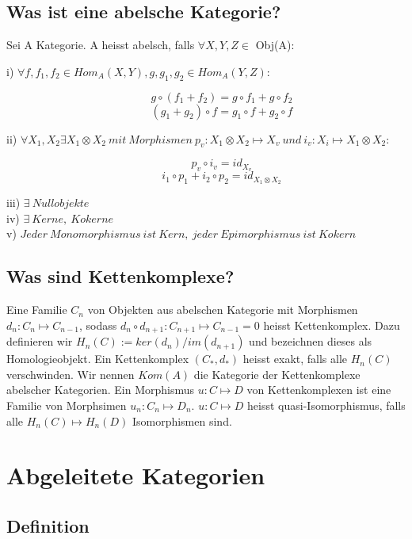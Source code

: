 \documentclass[12pt]{article}
\begin{document}
\subsection{Was ist eine abelsche Kategorie?}

Sei A Kategorie. A heisst abelsch, falls $\forall X,Y,Z \in$ Obj(A):
\begin{description}
    \item[i) $\forall f,f_1,f_2 \in Hom_A(X,Y), g,g_1,g_2 \in Hom_A(Y,Z):$]
        \[g \circ (f_1 + f_2) = g \circ f_1 + g \circ f_2\]
        \[(g_1 + g_2) \circ f = g_1 \circ f + g_2 \circ f\]
    \item[ii) $\forall X_1,X_2 \exists X_1 \otimes X_2 \: mit \: Morphismen \: p_v : X_1 \otimes X_2 \mapsto X_v \: und \: i_v : X_i \mapsto X_1 \otimes X_2:$]
        \[p_v \circ i_v = id_{X_v}\]
        \[i_1 \circ p_1 + i_2 \circ p_2 = id_{X_1 \otimes X_2}\]
    \item[iii) $\exists \: Nullobjekte$]
    \item[iv) $\exists \: Kerne,\: Kokerne$]
    \item[v) $Jeder \: Monomorphismus \: ist \: Kern, \: jeder \: Epimorphismus \: ist \: Kokern$]   
\end{description}
    
\subsection{Was sind Kettenkomplexe?}

Eine Familie $C_n$ von Objekten aus abelschen Kategorie mit Morphismen $d_n : C_n \mapsto C_{n-1}$, sodass $d_n \circ d_{n+1} : C_{n+1} \mapsto C_{n-1} = 0$ 
heisst Kettenkomplex. Dazu definieren wir $H_n(C) := ker(d_n) / im(d_{n+1})$ und bezeichnen dieses als Homologieobjekt. Ein Kettenkomplex $(C_*, d_*)$ 
heisst exakt, falls alle $H_n(C)$ verschwinden. Wir nennen $Kom(A)$ die Kategorie der Kettenkomplexe abelscher Kategorien. Ein Morphismus $u : C \mapsto D$ 
von Kettenkomplexen ist eine Familie von Morphsimen $u_n : C_n \mapsto D_n$. $u: C \mapsto D$ heisst quasi-Isomorphismus, falls alle 
$H_n(C) \mapsto H_n(D)$ Isomorphismen sind.
\newpage

\section{Abgeleitete Kategorien}
\subsection{Definition}
\end{document}
